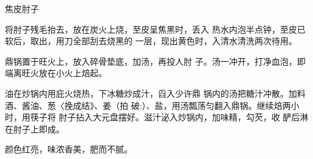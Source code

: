 \begin{recipe}{焦皮肘子}

\ingredients



\cooking

\step 将肘子残毛抬去，放在炭火上烧，至皮呈焦黑时，丢入 热水内泡半点钟，至皮已软后，取出，用刀全部刮去烧黑的 一层，现出黄色时，入清水清洗两次待用。

\step 鼎锅置于旺火上，放入碎骨垫底，加汤，再投人肘 子。汤一冲开，打净血泡，即端离旺火放在小火上焙起。

油在炒锅内用庇火烧热，下冰糖炒成汁，舀入少许鼎 锅内的汤把糖汁冲散。加料酒、酱油、葱〈挽成结》、姜（拍 破:）、盐，用汤瓢荡匀翻入鼎锅。继续焙两小时，用筷子将 肘子拈入大元盘摆好。滋汁泌入炒锅内，加味精，勾芡，收 酽后淋在肘子上即成。

\notes

颜色红亮，味浓香美，肥而不腻。

\end{recipe}

